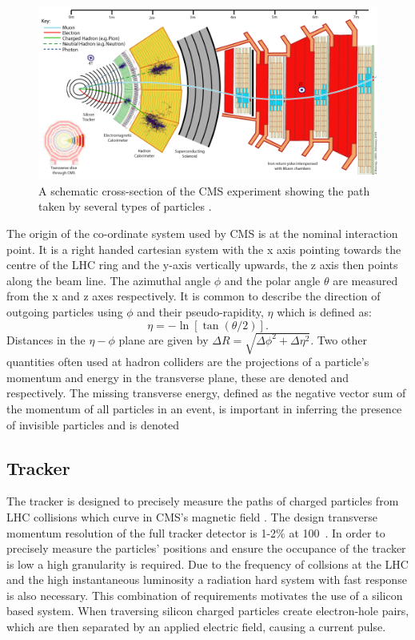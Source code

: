 \begin{figure}
  \includegraphics[width=1.2\largefigwidth]{plots/detector/CMS_Slice.png}
  \caption{A schematic cross-section of the CMS experiment showing the path taken by several types of particles \cite{CMSSlice}.}
  \label{fig:cmsschematic2}
\end{figure}

The origin of the co-ordinate system used by CMS is at the nominal interaction point. It is a right handed cartesian system with the x axis pointing towards the centre of the LHC ring and the y-axis vertically upwards, the z axis then points along the beam line. The azimuthal angle $\phi$ and the polar angle $\theta$ are measured from the x and z axes respectively. It is common to describe the direction of outgoing particles using $\phi$ and their pseudo-rapidity, $\eta$ which is defined as:
\begin{equation}
  \label{eq:eta}
  \eta=-\ln[\tan(\theta/2)].
\end{equation}
Distances in the $\eta-\phi$ plane are given by $\Delta R=\sqrt{\Delta\phi^2+\Delta\eta^2}$. Two other quantities often used at hadron colliders are the projections of a particle's momentum and energy in the transverse plane, these are denoted \pt and \Et respectively. The missing transverse energy, defined as the negative vector sum of the momentum of all particles in an event, is important in inferring the presence of invisible particles and is denoted \MET

\subsection{Tracker}
\label{sec:tracker}
The tracker is designed to precisely measure the paths of charged particles from LHC collisions which curve in CMS's magnetic field \cite{Chatrchyan:2008aa}. The design transverse momentum resolution of the full tracker detector is 1-2\% at 100\GeV~. In order to precisely measure the particles' positions and ensure the occupance of the tracker is low a high granularity is required. Due to the frequency of collsions at the LHC and the high instantaneous luminosity a radiation hard system with fast response is also necessary. This combination of requirements motivates the use of a silicon based system. When traversing silicon charged particles create electron-hole pairs, which are then separated by an applied electric field, causing a current pulse.

